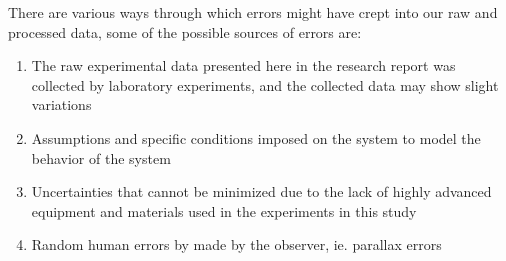 {There are various ways through which errors might have crept into our raw and processed data, some of the possible sources of errors are:}
      
      \begin{enumerate}
          \item {The raw experimental data presented here in the research report was collected by laboratory experiments, and the collected data may show slight variations}
          \item {Assumptions and specific conditions imposed on the system to model the behavior of the system}          
          \item {Uncertainties that cannot be minimized due to the lack of highly advanced equipment and materials used in the experiments in this study}          
          \item {Random human errors by made by the observer, ie. parallax errors}
      \end{enumerate}

